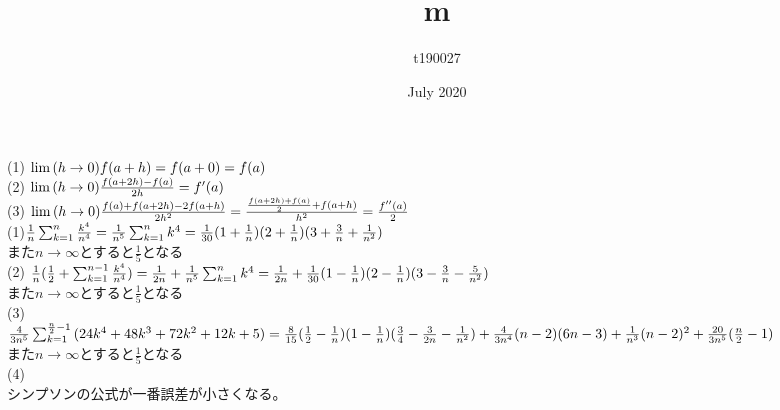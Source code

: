 \documentclass{article}
\title{m}
\author{t190027}
\date{July 2020}
\begin{document}
\maketitle{}
(1)
$\lim{(h\to0)}f(a+h)\\
=f(a+0)=f(a)$\\
(2)
$\lim{(h\to0)}\frac{f(a+2h)-f(a)}{2h}\\
=f'(a)$\\
(3)
$\lim{(h\to0)}\frac{f(a)+f(a+2h)-2f(a+h)}{2h^{2}}\\
=\frac{\frac{f(a+2h)+f(a)}{2}+f(a+h)}{h^{2}}\\
=\frac{f''(a)}{2}$\\
(1)$\frac{1}{n}\sum_{k=1}^{n}{\frac{k^{4}}{n^{4}}}\\
=\frac{1}{n^{5}}\sum_{k=1}^{n}{k^{4}\\
=\frac{1}{30}(1+\frac{1}{n})(2+\frac{1}{n})(3+\frac{3}{n}+\frac{1}{n^{2}})}$\\
また$n\to \infty$とすると$\frac{1}{5}$となる\\
(2)
$\frac{1}{n}(\frac{1}{2}+\sum_{k=1}^{n-1}{\frac{k^{4}}{n^{4}}})\\
=\frac{1}{2n}+\frac{1}{n^{5}}\sum_{k=1}^{n}{k^{4}\\
=\frac{1}{2n}+\frac{1}{30}(1-\frac{1}{n})(2-\frac{1}{n})(3-\frac{3}{n}-\frac{5}{n^{2}})}$\\
また$n\to \infty$とすると$\frac{1}{5}$となる\\
(3)\\$\frac{4}{3n^{5}}\sum_{k=1}^{\frac{n}{2}-1}{(24k^{4}+48k^{3}+72k^{2}+12k+5)}\\
=\frac{8}{15}(\frac{1}{2}-\frac{1}{n})(1-\frac{1}{n})(\frac{3}{4}-\frac{3}{2n}-\frac{1}{n^{2}})+\frac{4}{3n^{4}}(n-2)(6n-3)+\frac{1}{n^{3}}(n-2)^{2}+\frac{20}{3n^{5}}(\frac{n}{2}-1)$\\
また$n\to \infty$とすると$\frac{1}{5}$となる\\
(4)\\シンプソンの公式が一番誤差が小さくなる。
\end{document}
